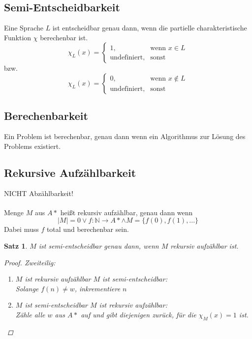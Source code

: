\documentclass{article}
\begin{document}
\subsection{Semi-Entscheidbarkeit}
Eine Sprache $L$ ist entscheidbar genau dann, wenn die partielle charakteristische Funktion $\chi$ berechenbar ist.
\begin{equation}
    \chi _L(x)=
    \begin{cases}
        1,                  & \text{wenn } x\in L \\
        \text{undefiniert}, & \text{sonst}
    \end{cases}
\end{equation}
bzw.
\begin{equation}
    \chi _L(x)=
    \begin{cases}
        0,                  & \text{wenn } x\not\in L \\
        \text{undefiniert}, & \text{sonst}
    \end{cases}
\end{equation}
\subsection{Berechenbarkeit}
Ein Problem ist berechenbar, genau dann wenn ein Algorithmus zur Lösung des Problems existiert.
\subsection{Rekursive Aufzählbarkeit}
\Rightarrow NICHT Abzählbarkeit!\\\\
Menge $M$ aus $A*$ heißt rekursiv aufzählbar, genau dann wenn
\begin{equation}
    |M|=0 \vee f:\mathbb{N}\rightarrow A* \wedge M=\{f(0), f(1),...\}
\end{equation}
Dabei muss $f$ total und berechenbar sein.\\
\newtheorem*{RaSe}{Satz}
\begin{framed}
    \begin{RaSe}
        $M$ ist semi-entscheidbar genau dann, wenn $M$ rekursiv aufzählbar ist.
        \begin{proof}
            Zweiteilig:
            \begin{enumerate}
                \item $M$ ist rekursiv aufzählbar \Rightarrow $M$ ist semi-entscheidbar:\\
                      Solange $f(n) \not= w$, inkrementiere $n$
                \item $M$ ist semi-entscheidbar \Rightarrow $M$ ist rekursiv aufzählbar:\\
                      Zähle alle $w$ aus $A*$ auf und gibt diejenigen zurück, für die $\chi_M(x) = 1$ ist.
                      \qedhere
            \end{enumerate}
        \end{proof}
    \end{RaSe}
\end{framed}
\end{document}
